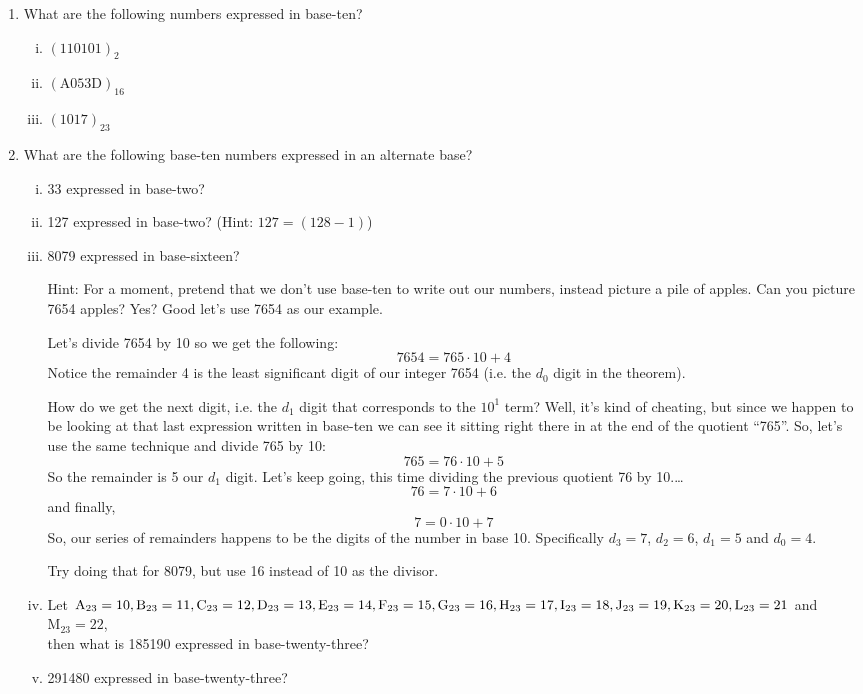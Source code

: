 \documentclass{article}
\begin{document}
\begin{enumerate}
\item What are the following numbers expressed in base-ten?
\begin{enumerate}[i)]
\item $(110101)_2$
\item $(\text{A}053\text{D})_{16}$
\item $(1017)_{23}$
\end{enumerate}
\item What are the following base-ten numbers expressed in an alternate base?
\begin{enumerate}[i)]
\item 33 expressed in base-two?
\item 127 expressed in base-two? (Hint: $127 = (128-1)$)
\item 8079 expressed in base-sixteen?

Hint: For a moment, pretend that we don't use base-ten to
write out our numbers, instead picture a pile of apples.
Can you picture 7654 apples?  Yes?  Good let's use 7654 as our example.

Let's divide 7654 by 10 so we get the following:
\[7654 = 765\cdot{}10+4\]
Notice the remainder 4 is the least significant digit of our
integer 7654  (i.e. the $d_0$ digit in the theorem).

How do we get the next digit, i.e. the $d_1$ digit that corresponds to the $10^1$ term? Well, it’s kind of cheating, but
since we happen to be looking at that last expression written in
base-ten we can see it sitting right there in at the
end of the quotient ``765''. So, let's use the same technique and divide 765 by 10:
\[765 = 76\cdot{}10+5\]
So the remainder is 5 our $d_1$ digit.  Let's keep going, this time dividing the previous quotient 76 by 10.\dots	
\[76 = 7\cdot{}10+6\]
and finally,
\[7= 0\cdot{}10+7\]
So, our series of remainders happens to be the digits of the number in base 10.
Specifically $d_3 = 7$, $d_2=6$, $d_1=5$ and $d_0=4$.

Try doing that for 8079, but use 16 instead of 10 as the divisor.
\item Let $\text{A}_{23} = 10, \text{B}_{23} = 11, \text{C}_{23} = 12, \text{D}_{23} = 13, \text{E}_{23} = 14, \text{F}_{23} = 15,
\text{G}_{23} = 16,\\
\text{H}_{23} = 17, \text{I}_{23} = 18, \text{J}_{23} = 19, \text{K}_{23} = 20, \text{L}_{23} = 21$ and $\text{M}_{23} = 22$,\\
then what is 185190 expressed in base-twenty-three?
\item 291480 expressed in base-twenty-three?
\end{enumerate}

\end{enumerate}
\end{document}
